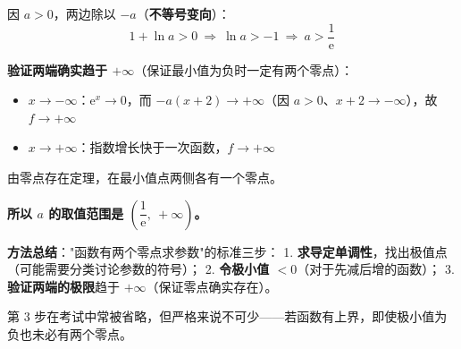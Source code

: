 \begin{answer}
因 $a>0$，两边除以 $-a$（\textbf{不等号变向}）：
\nopagebreak[4]
\[1+\ln a>0\ \Longrightarrow\ \ln a>-1\ \Longrightarrow\ a>\frac1{\mathrm e}\]

\textbf{验证两端确实趋于 $+\infty$}（保证最小值为负时一定有两个零点）：
\begin{itemize}
\item $x\to-\infty$：$\mathrm e^{x}\to0$，而 $-a(x+2)\to+\infty$（因 $a>0$、$x+2\to-\infty$），故 $f\to+\infty$ 
\item $x\to+\infty$：指数增长快于一次函数，$f\to+\infty$ 
\end{itemize}

由零点存在定理，在最小值点两侧各有一个零点。

\textbf{所以 $a$ 的取值范围是 $\left(\dfrac1{\mathrm e},\ +\infty\right)$。}

\begin{gktip}
\textbf{方法总结}："函数有两个零点求参数"的标准三步：
1. \textbf{求导定单调性}，找出极值点（可能需要分类讨论参数的符号）；
2. \textbf{令极小值 $<0$}（对于先减后增的函数）；
3. \textbf{验证两端的极限}趋于 $+\infty$（保证零点确实存在）。

第 3 步在考试中常被省略，但严格来说不可少——若函数有上界，即使极小值为负也未必有两个零点。
\end{gktip}



\par\medskip

\end{answer}
